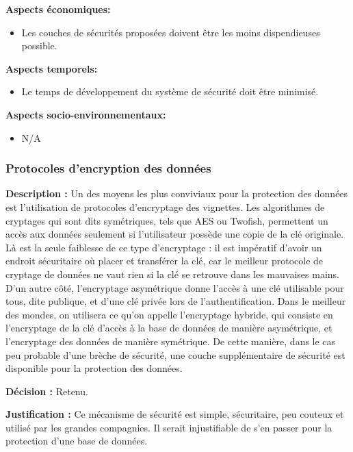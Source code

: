 \textbf{Aspects économiques:}
\begin{itemize}[label = {--}]
    \item Les couches de sécurités proposées doivent être les moins dispendieuses possible.
\end{itemize}

\textbf{Aspects temporels:}
\begin{itemize}[label = {--}]
    \item Le temps de développement du système de sécurité doit être minimisé.
\end{itemize}

\textbf{Aspects socio-environnementaux:}
\begin{itemize}[label = {--}]
    \item N/A %
\end{itemize}


\subsubsection{Protocoles d’encryption des données}

\textbf{Description :} Un des moyens les plus conviviaux pour la protection des données est l’utilisation de protocoles d’encryptage des vignettes. Les algorithmes de cryptages qui sont dits symétriques, tels que AES ou Twofish, permettent un accès aux données seulement si l’utilisateur possède une copie de la clé originale. Là est la seule faiblesse de ce type d’encryptage : il est impératif d’avoir un endroit sécuritaire où placer et transférer la clé, car le meilleur protocole de cryptage de données ne vaut rien si la clé se retrouve dans les mauvaises mains. D’un autre côté, l’encryptage asymétrique donne l’accès à une clé utilisable pour tous, dite publique, et d’une clé privée lors de l’authentification. Dans le meilleur des mondes, on utilisera ce qu’on appelle l’encryptage hybride, qui consiste en l’encryptage de la clé d’accès à la base de données de manière asymétrique, et l’encryptage des données de manière symétrique. De cette manière, dans le cas peu probable d’une brèche de sécurité, une couche supplémentaire de sécurité est disponible pour la protection des données.

\textbf{Décision :} Retenu.

\textbf{Justification :}  Ce mécanisme de sécurité est simple, sécuritaire, peu couteux et utilisé par les grandes compagnies. Il serait injustifiable de s’en passer pour la protection d’une base de données.


